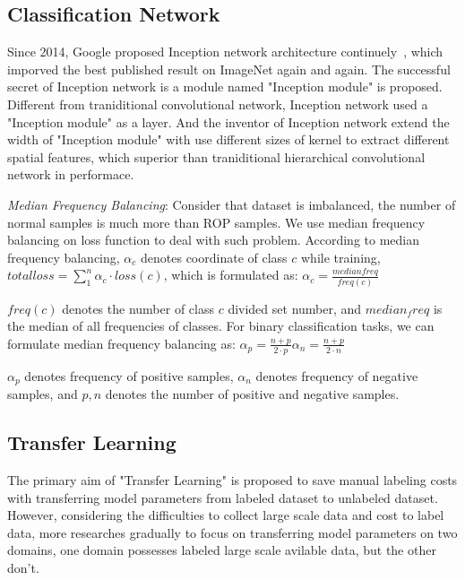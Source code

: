 \documentclass[10pt,twocolumn,letterpaper]{article}
\begin{document}
\subsection{Classification Network}
  Since 2014, Google proposed Inception network architecture continuely~\cite{03, 04, 05, 06}, which imporved the best published result on ImageNet again and again. The successful secret of Inception network is a module named "Inception module" is proposed. Different from traniditional convolutional network, Inception network used a "Inception module"  as a layer. And the inventor of Inception network extend the width of "Inception module" with use different sizes of kernel to extract different spatial features, which superior than traniditional hierarchical convolutional network in performace.

  \emph{Median Frequency Balancing}: Consider that dataset is imbalanced, the number of normal samples is much more than ROP samples. We use median frequency balancing on loss function to deal with such problem. According to median frequency balancing, ${\alpha}_c$ denotes coordinate of class $c$ while training, \eg $ total loss = \sum_1^{n} {{{\alpha}_c} \cdot loss(c)}$, which is formulated as:
  \begin{math}
    {\alpha}_c = \frac{median freq}{freq(c)}
  \end{math}

  $freq(c)$ denotes the number of class $c$ divided set number, and $median_freq$ is the median of all frequencies of classes. For binary classification tasks, we can formulate median frequency balancing as:
  \begin{math}
    {\alpha}_p = \frac{n + p}{2 \cdot p}
    {\alpha}_n = \frac{n + p}{2 \cdot n}
  \end{math}

  ${\alpha}_p$ denotes frequency of positive samples, ${\alpha}_n$ denotes frequency of negative samples, and $p, n$ denotes the number of positive and negative samples.

\subsection{Transfer Learning}
    The primary aim of "Transfer Learning" is proposed to save manual labeling costs with transferring model parameters from labeled dataset to unlabeled dataset. However, considering the difficulties to collect large scale data and cost to label data, more researches gradually to focus on transferring model parameters on two domains, one domain possesses labeled large scale avilable data, but the other don't.
\end{document}

